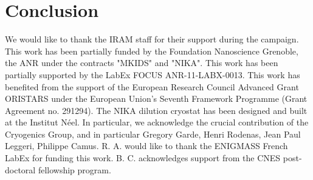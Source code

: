 \documentclass[twocolumn,traditabstract]{aa}
\begin{document}
\section{Conclusion}
\label{sec:conclusion}


\begin{acknowledgements}
We would like to thank the IRAM staff for their support during the campaign. 
This work has been partially funded by the Foundation Nanoscience Grenoble, the ANR under the contracts "MKIDS" and "NIKA". 
This work has been partially supported by the LabEx FOCUS ANR-11-LABX-0013. 
This work has benefited from the support of the European Research Council Advanced Grant ORISTARS under the European Union's Seventh Framework Programme (Grant Agreement no. 291294).
The NIKA dilution cryostat has been designed and built at the Institut N\'eel. In particular, we acknowledge the crucial contribution of the Cryogenics Group, and in particular Gregory Garde, Henri Rodenas, Jean Paul Leggeri, Philippe Camus. 
R. A. would like to thank the ENIGMASS French LabEx for funding this work. 
B. C. acknowledges support from the CNES post-doctoral fellowship program. 
\end{acknowledgements}

\end{document}
